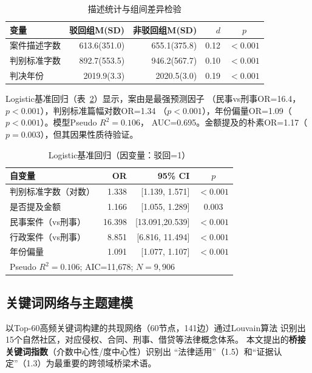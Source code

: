 \documentclass[12pt,a4paper,twoside]{ctexart}
\newcommand{\tabref}[1]{表~\ref{tab:#1}}
\begin{document}
\begin{table}[H]\centering\caption{描述统计与组间差异检验}
\label{tab:desc}
\begin{tabular}{@{}lrrrc@{}}
\toprule
\textbf{变量} & \textbf{驳回组M(SD)} & \textbf{非驳回组M(SD)} & \textbf{$d$} & \textbf{$p$} \\
\midrule
案件描述字数 & 613.6(351.0) & 655.1(375.8) & 0.12 & $<0.001$ \\
判别标准字数 & 892.7(553.5) & 946.2(567.7) & 0.10 & $<0.001$ \\
判决年份     & 2019.9(3.3)  & 2020.5(3.0)  & 0.19 & $<0.001$ \\
\bottomrule
\end{tabular}
\end{table}

Logistic基准回归（\tabref{logistic}）显示，案由是最强预测因子
（民事vs刑事OR=16.4，$p<0.001$），判别标准篇幅对数OR=1.34
（$p<0.001$），年份偏量OR=1.09（$p<0.001$）。模型Pseudo $R^2=0.106$，
AUC=0.695。金额提及的朴素OR=1.17（$p=0.003$），但其因果性质待验证。

\begin{table}[H]\centering\caption{Logistic基准回归（因变量：驳回=1）}
\label{tab:logistic}
\begin{tabular}{@{}lrrc@{}}
\toprule
\textbf{自变量} & \textbf{OR} & \textbf{95\% CI} & \textbf{$p$} \\
\midrule
判别标准字数（对数） & 1.338 & [1.139, 1.571] & $<0.001$ \\
是否提及金额         & 1.166 & [1.055, 1.289] & 0.003 \\
民事案件（vs刑事）   & 16.398& [13.091,20.539]& $<0.001$ \\
行政案件（vs刑事）   & 8.851 & [6.816, 11.494]& $<0.001$ \\
年份偏量             & 1.091 & [1.077, 1.107] & $<0.001$ \\
\midrule
\multicolumn{4}{l}{\footnotesize Pseudo $R^2=0.106$; AIC=11,678; $N=9,906$} \\
\bottomrule
\end{tabular}
\end{table}

\subsection{关键词网络与主题建模}

以Top-60高频关键词构建的共现网络（60节点，141边）通过Louvain算法
识别出15个自然社区，对应侵权、合同、刑事、借贷等法律概念体系。
本文提出的\textbf{桥接关键词指数}（介数中心性/度中心性）识别出
``法律适用''（1.5）和``证据认定''（1.3）为最重要的跨领域桥梁术语。
\end{document}
